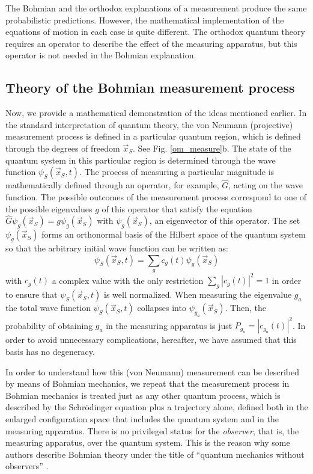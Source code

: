\documentclass[onecolumn,nofootinbib, secnumarabic, amsmath, nobibnotes,11pt,aps,pra]{revtex4-1}
\newcommand{\fref}[1]{Fig. \ref{#1}}
\begin{document}
The Bohmian and the orthodox explanations of a measurement produce the same probabilistic predictions. However, the mathematical implementation of the equations of motion in each case is quite different. The orthodox quantum theory requires an operator to describe the effect of the measuring apparatus, but this operator is not needed in the Bohmian explanation.

\subsection{Theory of the Bohmian measurement process}
\label{om.sec_measurement.1}

Now, we provide a mathematical demonstration of the ideas mentioned
earlier. In the standard interpretation of quantum theory, the von
Neumann (projective) measurement process is defined in a particular
quantum region, which is defined through the degrees of freedom
$\vec x_S$. See \fref{om_measure}b. The state of the quantum system
in this particular region is determined through the wave function
$\psi_S(\vec x_S,t)$. The process of measuring a particular
magnitude is mathematically defined through an operator, for
example, $\hat{G}$, acting on the wave function. The possible
outcomes of the measurement process correspond to one of the
possible eigenvalues $g$ of this operator that satisfy the equation
$\hat{G}\psi_g(\vec x_S) = g\psi_g(\vec x_S)$ with $\psi_g(\vec
x_S)$, an eigenvector of this operator. The set $\psi_g(\vec x_S)$
forms an orthonormal basis of the Hilbert space of the quantum
system so that the arbitrary initial wave function can be written
as:\enlargethispage{1pc}
\begin{equation}
\label{om.bmeasure1}
\psi_S(\vec x_S,t) = \sum_{g} c_g(t)\psi_g(\vec x_S)
\end{equation}
with $c_g(t)$ a complex value with the only restriction $\sum_{g}
|c_g(t)|^2 = 1$ in order to ensure that $\psi_S(\vec x_S,t)$ is well
normalized. When measuring the eigenvalue $g_a$ the total wave
function $\psi_S(\vec x_S,t)$ collapses into $\psi_{g_a}(\vec x_S)$.
Then, the probability of obtaining $g_a$ in the measuring apparatus
is just $P_{g_a} = |c_{g_a}(t)|^2$. In order to avoid unnecessary
complications, hereafter, we have assumed that this basis has no
degeneracy.

In order to understand how this (von Neumann) measurement can be
described by means of Bohmian mechanics, we repeat that the
measurement process in Bohmian mechanics is treated just as any
other quantum process, which is described by the Schr\"odinger
equation plus a trajectory alone, defined both in the enlarged
configuration space that includes the quantum system and in the
measuring apparatus. There is no privileged status for the
\emph{observer}, that is, the measuring apparatus, over the quantum
system. This is the reason why some authors describe Bohmian theory
under the title of ``quantum mechanics without observers''
\cite{om.Goldsteinobserver}.
\end{document}
